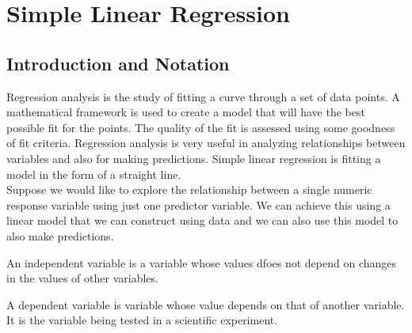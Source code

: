 \setcounter{equation}{0}
\chapter{Simple Linear Regression}
\label{chapterRegression}

\section{Introduction and Notation}

Regression analysis is the study of fitting a curve through a set of data points.
A mathematical framework is used to create a model that will have
the best possible fit for the points.
The quality of the fit is assessed using some goodness of fit criteria.
Regression analysis is very useful in analyzing relationships between
variables and also for making predictions.
Simple linear regression is fitting a model in the form of a straight line.\\

Suppose we would like to explore the relationship between 
a single numeric response variable
using just one predictor variable.
We can achieve this using a linear model that we can construct using data
and we can also use this model to also make predictions.



\begin{definition}	
An independent variable is a variable whose values dfoes not depend on 
changes in the values of other variables.
\end{definition}

\begin{definition}	
A dependent variable is variable whose value depends on that of another variable.
It is the variable being tested in a scientific experiment.
\end{definition}

